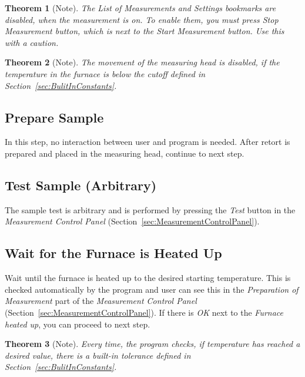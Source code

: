 \documentclass[a4paper,11pt,oneside]{report}
\theoremstyle{named}
\newtheorem*{namedtheorem}{Theorem}
\begin{document}
\begin{namedtheorem}[Note]
  The \textit{List of Measurements} and \textit{Settings} bookmarks are
  disabled, when the measurement is on. To enable them, you must press
  \textit{Stop Measurement} button, which is next to the \textit{Start
  Measurement} button. Use this with a caution.
\end{namedtheorem}

\begin{namedtheorem}[Note]
  The movement of the measuring head is disabled, if the temperature in the
  furnace is below the cutoff defined in Section~\ref{sec:BulitInConstants}.
\end{namedtheorem}

\subsection{Prepare Sample}
\label{sec:PrepareSample}

In this step, no interaction between user and program is needed. After retort is
prepared and placed in the measuring head, continue to next step.

\subsection{Test Sample (Arbitrary)}

The sample test is arbitrary and is performed by pressing the \textit{Test}
button in the \textit{Measurement Control Panel}
(Section~\ref{sec:MeasurementControlPanel}). 

\subsection{Wait for the Furnace is Heated Up}

Wait until the furnace is heated up to the desired starting temperature. This is
checked automatically by the program and user can see this in the
\textit{Preparation of Measurement} part of the \textit{Measurement Control
Panel} (Section~\ref{sec:MeasurementControlPanel}). If there is
\textit{OK} next to the \textit{Furnace heated up}, you can proceed to next
step.

\begin{namedtheorem}[Note]
  Every time, the program checks, if temperature has reached a desired value,
  there is a built-in tolerance defined in Section~\ref{sec:BulitInConstants}.
\end{namedtheorem}
\end{document}
